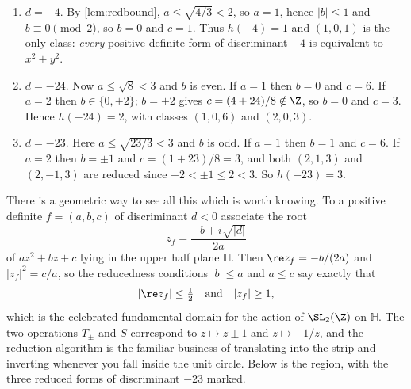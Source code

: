 \begin{example}\label{ex:classnumbers}
	\begin{enumerate}[label=(\roman*)]
		\item $d = -4$. By \autoref{lem:redbound}, $a \leq \sqrt{4/3} < 2$, so $a = 1$, hence $|b| \leq 1$ and $b \equiv 0 \pmod 2$, so $b = 0$ and $c = 1$. Thus $h(-4) = 1$ and $(1,0,1)$ is the only class: \emph{every} positive definite form of discriminant $-4$ is equivalent to $x^2 + y^2$.
		\item $d = -24$. Now $a \leq \sqrt 8 < 3$ and $b$ is even. If $a = 1$ then $b = 0$ and $c = 6$. If $a = 2$ then $b \in \{0, \pm2\}$; $b = \pm 2$ gives $c = (4+24)/8 \notin \Z$, so $b = 0$ and $c = 3$. Hence $h(-24) = 2$, with classes $(1,0,6)$ and $(2,0,3)$.
		\item $d = -23$. Here $a \leq \sqrt{23/3} < 3$ and $b$ is odd. If $a = 1$ then $b = 1$ and $c = 6$. If $a = 2$ then $b = \pm 1$ and $c = (1+23)/8 = 3$, and both $(2,1,3)$ and $(2,-1,3)$ are reduced since $-2 < \pm 1 \leq 2 < 3$. So $h(-23) = 3$.
	\end{enumerate}
\end{example}

There is a geometric way to see all this which is worth knowing. To a positive definite $f = (a,b,c)$ of discriminant $d < 0$ associate the root
$$
z_f = \frac{-b + i\sqrt{|d|}}{2a}
$$
of $az^2 + bz + c$ lying in the upper half plane $\mathbb H$. Then $\re z_f = -b/(2a)$ and $|z_f|^2 = c/a$, so the reducedness conditions $|b| \leq a$ and $a \leq c$ say exactly that
$$
|\re z_f| \leq \tfrac12 \quad \text{and} \quad |z_f| \geq 1,
$$
which is the celebrated fundamental domain for the action of $\SL_2(\Z)$ on $\mathbb H$. The two operations $T_\pm$ and $S$ correspond to $z \mapsto z \pm 1$ and $z \mapsto -1/z$, and the reduction algorithm is the familiar business of translating into the strip and inverting whenever you fall inside the unit circle. Below is the region, with the three reduced forms of discriminant $-23$ marked.

